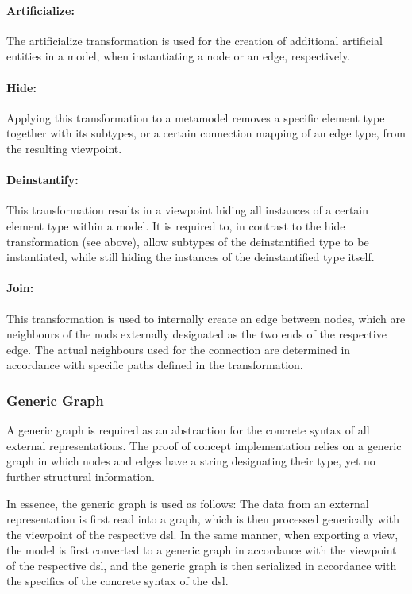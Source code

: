 \paragraph{Artificialize:} The artificialize transformation is used for the creation of additional artificial entities in a model, when instantiating a node or an edge, respectively.

\paragraph{Hide:} Applying this transformation to a metamodel removes a specific element type together with its subtypes, or a certain connection mapping of an edge type, from the resulting viewpoint.

\paragraph{Deinstantify:} This transformation results in a viewpoint hiding all instances of a certain element type within a model. It is required to, in contrast to the hide transformation (see above), allow subtypes of the deinstantified type to be instantiated, while still hiding the instances of the deinstantified type itself.

\paragraph{Join:} This transformation is used to internally create an edge between nodes, which are neighbours of the nods externally designated as the two ends of the respective edge. The actual neighbours used for the connection are determined in accordance with specific paths defined in the transformation.

\subsubsection{Generic Graph}

A generic graph is required as an abstraction for the concrete syntax of all external representations. The proof of concept implementation relies on a generic graph in which nodes and edges have a string designating their type, yet no further structural information.

In essence, the generic graph is used as follows: The data from an external representation is first read into a graph, which is then processed generically with the viewpoint of the respective \gls{dsl}. In the same manner, when exporting a view, the model is first converted to a generic graph in accordance with the viewpoint of the respective \gls{dsl}, and the generic graph is then serialized in accordance with the specifics of the concrete syntax of the \gls{dsl}.

